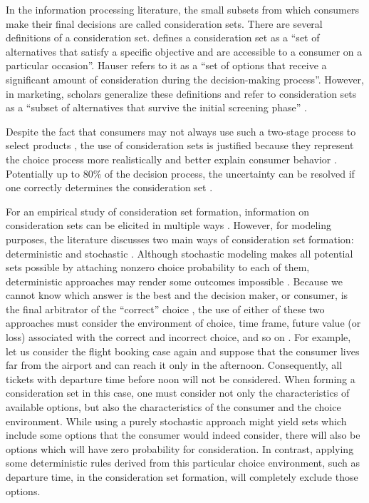 \documentclass[a4paper,12pt]{article}
\newcommand{\citeyearonly}[1]{\citeyearpar{#1}}
\begin{document}
In the information processing literature, the small subsets from which consumers make their final decisions are called consideration sets. There are several definitions of a consideration set. \citep{shocker1991consideration} defines a consideration set as a ``set of alternatives that satisfy a specific objective and are accessible to a consumer on a particular occasion''. Hauser \citeyearonly{hauser1990evaluation} refers to it as a ``set of options that receive a significant amount of consideration during the decision-making process''. However, in marketing, scholars generalize these definitions and refer to consideration sets as a ``subset of alternatives that survive the initial screening phase'' \citep{haubl2000consumer}. 

Despite the fact that consumers may not always use such a two-stage process to select products \citep{hauser2009non}, the use of consideration sets is justified because they represent the choice process more realistically and better explain consumer behavior \citep{horowitz1995role}. Potentially up to 80\% of the decision process, the uncertainty can be resolved if one correctly determines the consideration set  \citep{hauser1978testing}. 

For an empirical study of consideration set formation, information on consideration sets can be elicited in multiple ways \citep{gaskin2007two,yee2007greedoid, ding2011unstructured}. However, for modeling purposes, the literature discusses two main ways of consideration set formation: deterministic \citep{coombs1951mathematical} and stochastic \citep{mcfadden1973conditional, urban1984testing}. Although stochastic modeling makes all potential sets possible by attaching nonzero choice probability to each of them, deterministic approaches may render some outcomes impossible \citep{aribarg2018advancing}. Because we cannot know which answer is the best and the decision maker, or consumer, is the final arbitrator of the ``correct'' choice \citep{hauser2014consideration}, the use of either of these two approaches must consider the environment of choice, time frame, future value (or loss) associated with the correct and incorrect choice, and so on \citep{punj2009information}. For example, let us consider the flight booking case again and suppose that the consumer lives far from the airport and can reach it only in the afternoon. Consequently, all tickets with departure time before noon will not be considered. When forming a consideration set in this case, one must consider not only the characteristics of available options, but also the characteristics of the consumer and the choice environment. While using a purely stochastic approach might yield sets which include some options that the consumer would indeed consider, there will also be options which will have zero probability for consideration. In contrast, applying some deterministic rules derived from this particular choice environment, such as departure time, in the consideration set formation, will completely exclude those options.
\end{document}
